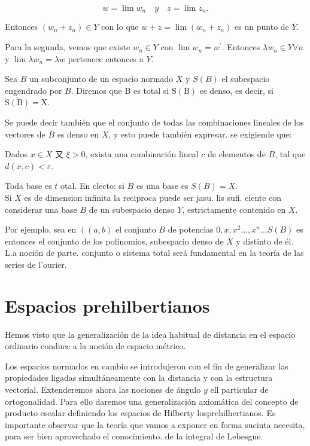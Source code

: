\documentclass[10pt]{article}
\theoremstyle{plain}
\theoremstyle{definition}
\theoremstyle{remark}
\begin{document}
$$
w=\lim w_{n} \quad y \quad z=\lim z_{n} .
$$

Entonces $\left(w_{n}+z_{n}\right) \in Y$ con lo que $w+z=\lim \left(w_{n}+z_{n}\right)$ es un punto de $\bar{Y}$.

Para la segunda, vemos que existe $w_{n} \in Y$ con $\lim w_{n}=w^{\prime}$. Entonces $\lambda w_{n} \in Y \forall n$ y $\lim \lambda w_{n}=\lambda w$ pertenece entonces a $Y$.

Sea $B$ un subconjunto de un espacio normado $X$ y $S(B)$ el subespacio engendrado por $B$. Diremos que B es total si $\mathrm{S}(\mathrm{B})$ es denso, es decir, si $\overline{\mathrm{S}(\mathrm{B})}=\mathrm{X}$.

Se puede decir también que el conjunto de todas las combinaciones lineales de los vectores de $B$ es denso en $X$, y esto puede también expresar. se exigiende que:

Dados $x \in X$ 又 $\xi>0$, exista una combinación lineal $c$ de elementos de $B$, tal que $d(x, c)<\varepsilon$.

Toda base es $t$ otal. En clecto: si $B$ es una base es $S(B)=X$.\\
Si $X$ es de dimension infinita la reciproca puede ser jasu. lis sufi. ciente con considerar una base $B$ de un subespacio denso $Y$, estrictamente contenido en $X$.

Por ejemplo, sea en $\left((a, b)\right.$ el conjunto $B$ de potencias $0, x, x^{2} \ldots, x^{n} \ldots S(B)$ es entonces el conjunto de los polinomios, subespacio denso de $X$ y distinto de él.\\
L.a noción de parte. conjunto o sistema total será fundamental en la teoría de las series de l'ourier.

\section{Espacios prehilbertianos}
Hemos visto que la generalización de la idea habitual de distancia en el espacio ordinario conduce a la noción de espacio métrico.

Los espacios normados en cambio se introdujeron con el fin de generalizar las propiedades ligadas simultáneamente con la distancia y con la estructura vectorial. Extenderemos ahora las nociones de ángulo $y$ ell particular de ortogonalidad. Para ello daremos una generalización axiomática del concepto de producto escalar definiendo los espacios de Hilberty losprehilhertianos. Es importante observar que la teoría que vamos a exponer en forma sucinta necesita, para ser bien aprovechado el conocimiento. de la integral de Lebesgue.
\end{document}
